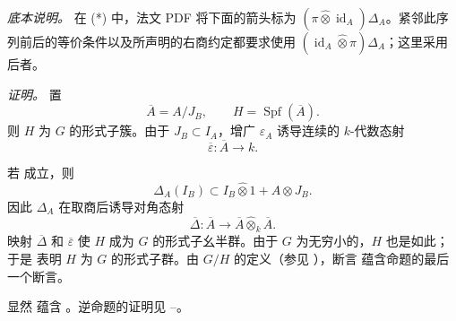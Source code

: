 \label{sga3:VIIB:5.1:source-arrow-note}
\noindent\textit{底本说明。}\enspace
在 \textup{(*)} 中，法文 PDF 将下面的箭头标为 \((\pi\widehat\otimes\operatorname{id}_A)\Delta_A\)。紧邻此序列前后的等价条件以及所声明的右商约定都要求使用 \((\operatorname{id}_A\widehat\otimes\pi)\Delta_A\)；这里采用后者。

\medskip
\noindent\textit{证明。}
置
\[
  \overline A=A/J_B,
  \qquad
  H=\operatorname{Spf}(\overline A).
\]
则 \(H\) 为 \(G\) 的形式子簇。由于 \(J_B\subset I_A\)，增广 \(\varepsilon_A\) 诱导连续的 \(k\)-代数态射
\[
  \overline\varepsilon:\overline A\longrightarrow k.
\]

若 \textup{} 成立，则
\[
  \Delta_A(I_B)
  \subset
  I_B\widehat\otimes1
  +
  A\widehat\otimes J_B.
\]
因此 \(\Delta_A\) 在取商后诱导对角态射
\[
  \overline\Delta:\overline A
  \longrightarrow
  \overline A\widehat\otimes_k\overline A.
\]
映射 \(\overline\Delta\) 和 \(\overline\varepsilon\) 使 \(H\) 成为 \(G\) 的形式子幺半群。由于 \(G\) 为无穷小的，\(H\) 也是如此；于是  表明 \(H\) 为 \(G\) 的形式子群。由 \(G/H\) 的定义\textup{（参见 ）}，断言 \textup{} 蕴含命题的最后一个断言。

显然 \textup{} 蕴含 \textup{}。逆命题的证明见 --。

